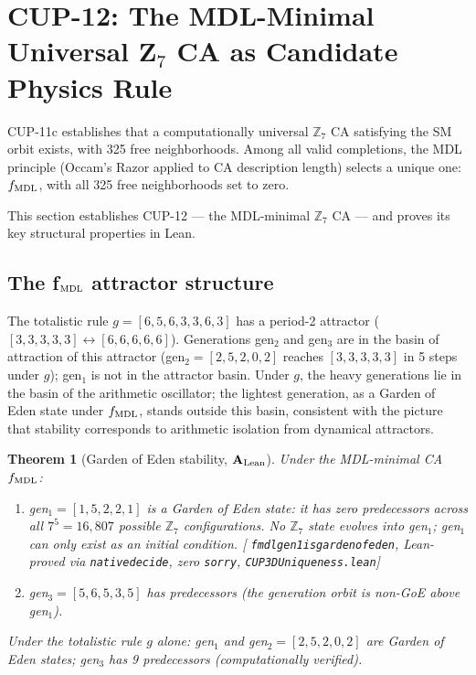 \documentclass[11pt]{article}
\newtheorem{theorem}{Theorem}[section]
\theoremstyle{remark}
\newcommand{\lean}[1]{%
  \penalty-100
  \begingroup\def\_{\textunderscore\allowbreak}\texttt{#1}\endgroup}
\newcommand{\CatAL}{\ensuremath{\textbf{A}_{\rm Lean}}}
\begin{document}
\section{CUP-12: The MDL-Minimal Universal Z$_7$ CA as Candidate Physics Rule}
\label{sec:cup12}

CUP-11c establishes that a computationally universal $\mathbb{Z}_7$ CA satisfying the SM orbit exists, with 325 free neighborhoods. Among all valid completions, the MDL principle (Occam's Razor applied to CA description length) selects a unique one: $f_{\rm MDL}$, with all 325 free neighborhoods set to zero.

This section establishes CUP-12 — the MDL-minimal $\mathbb{Z}_7$ CA — and proves its key structural properties in Lean.

\subsection{The f$_{\rm MDL}$ attractor structure}

The totalistic rule $g = [6,5,6,3,3,6,3]$ has a period-2 attractor
($[3,3,3,3,3] \leftrightarrow [6,6,6,6,6]$). Generations gen$_2$ and gen$_3$ are
in the basin of attraction of this attractor (gen$_2 = [2,5,2,0,2]$ reaches
$[3,3,3,3,3]$ in 5 steps under $g$); gen$_1$ is not in the attractor basin.
Under $g$, the heavy generations lie in the basin of the arithmetic oscillator;
the lightest generation, as a Garden of Eden state under $f_{\rm MDL}$, stands outside
this basin, consistent with the picture that stability corresponds to arithmetic
isolation from dynamical attractors.

\begin{theorem}[Garden of Eden stability, $\CatAL$]
\label{thm:goe}
Under the MDL-minimal CA $f_{\rm MDL}$:
\begin{enumerate}
\item gen$_1 = [1,5,2,2,1]$ is a Garden of Eden state: it has zero predecessors
  across all $7^5 = 16{,}807$ possible $\mathbb{Z}_7$ configurations.
  No $\mathbb{Z}_7$ state evolves into gen$_1$; gen$_1$ can only exist as an initial condition.
  [\lean{fmdl\_gen1\_is\_garden\_of\_eden}, Lean-proved via \lean{native\_decide}, zero
  \texttt{sorry}, \lean{CUP3DUniqueness.lean}]
\item gen$_3 = [5,6,5,3,5]$ has predecessors (the generation orbit is non-GoE above gen$_1$).
\end{enumerate}
Under the totalistic rule $g$ alone: gen$_1$ and gen$_2 = [2,5,2,0,2]$ are Garden of Eden
states; gen$_3$ has 9 predecessors (computationally verified).
\end{theorem}
\end{document}
